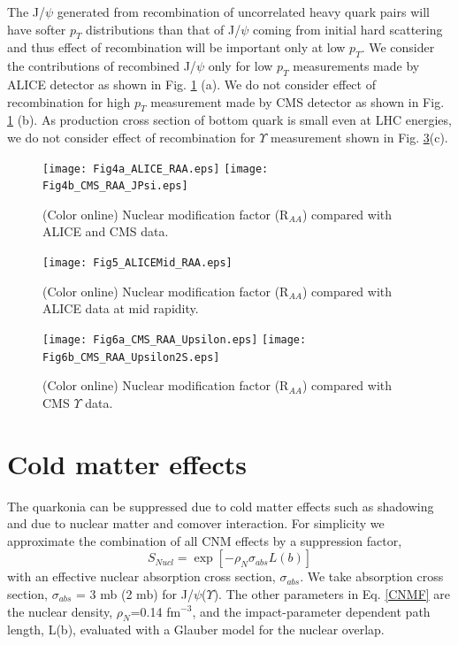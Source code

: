 \documentclass[aps,prc,preprint,superscriptaddress,showpacs,showkeys]{revtex4-1}
\begin{document}
 The J/$\psi$ generated from recombination of uncorrelated heavy quark pairs will have 
softer $p_{T}$ distributions than that of J/$\psi$ coming from initial hard scattering and thus 
effect of recombination will be important only at low $p_T$. We consider the contributions of recombined J/$\psi$
only for low $p_{T}$ measurements made by ALICE detector as shown in Fig. \ref{fig:JPsiRaa} (a).     
 We do not consider effect of recombination for high $p_{T}$ measurement made by CMS detector \cite{CMSUpsilon,CMSJPsi} 
as shown in Fig. \ref{fig:JPsiRaa} (b). As production cross section of bottom quark is small even at LHC energies,
we do not consider effect of recombination for $\Upsilon$ measurement shown in Fig. \ref{fig:UpsilonRaa}(c).



\begin{figure}
\texttt{[image: Fig4a\_ALICE\_RAA.eps]}
\texttt{[image: Fig4b\_CMS\_RAA\_JPsi.eps]}
\caption{(Color online) Nuclear modification factor (R$_{AA}$) compared with ALICE and CMS data.}
\label{fig:JPsiRaa}
\end{figure}

\begin{figure}
\texttt{[image: Fig5\_ALICEMid\_RAA.eps]}
\caption{(Color online) Nuclear modification factor (R$_{AA}$) compared with ALICE data at mid
rapidity.}
\label{fig:JPsiRaaALICEMid}
\end{figure}

\begin{figure}
\texttt{[image: Fig6a\_CMS\_RAA\_Upsilon.eps]}
\texttt{[image: Fig6b\_CMS\_RAA\_Upsilon2S.eps]}
\caption{(Color online) Nuclear modification factor (R$_{AA}$) compared with CMS $\Upsilon$ data. }
\label{fig:UpsilonRaa}
\end{figure}

 
\section{Cold matter effects}
The quarkonia can be suppressed due to cold matter effects such as shadowing and due to nuclear
matter and comover interaction. For simplicity we approximate the combination of all CNM effects 
by a suppression factor,
\begin{equation}
  S_{Nucl}=\exp[-\rho_{N}\sigma_{abs}L(b)]
  \label{CNMF}
\end{equation}
with an effective nuclear absorption cross section, $\sigma_{abs}$.
We take absorption cross section, $\sigma_{abs}$ = 3 mb (2 mb) for
J/$\psi$($\Upsilon$). The other parameters in Eq. \ref{CNMF} are the nuclear density,
$\rho_N$=0.14 fm$^{-3}$, and the impact-parameter dependent path length, L(b), evaluated 
with a Glauber model \cite{GM_PShukla} for the nuclear overlap.
\end{document}
